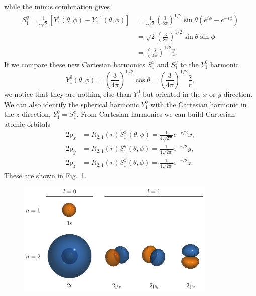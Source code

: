 \documentclass[../Main/chem331-notes.tex]{subfiles}
\begin{document}
while the minus combination gives
\begin{equation}
\begin{split}
S_1^y = \frac{1}{i\sqrt{2}} \left[ Y_1^1(\theta,\phi) - Y_1^{-1}(\theta,\phi) \right]
& = \frac{1}{i\sqrt{2}} \left( \frac{3}{8\pi} \right)^{1/2} \sin \theta \left( e^{i\phi} - e^{-i\phi} \right) \\
& = \sqrt{2} \left( \frac{3}{8\pi} \right)^{1/2} \sin \theta \sin \phi \\
& = \left( \frac{3}{4\pi} \right)^{1/2} \frac{y}{r}.
\end{split}
\end{equation}
If we compare these new  Cartesian harmonics $S_1^x$ and $S_1^y$ to the $Y_1^0$ harmonic
\begin{equation}
Y_1^0(\theta,\phi) = \left( \frac{3}{4\pi} \right)^{1/2} \cos \theta = \left( \frac{3}{4\pi} \right)^{1/2} \frac{z}{r},
\end{equation}
we notice that they are nothing else than $Y_1^0$ but oriented in the $x$ or $y$ direction. We can also identify the spherical harmonic $Y_1^0$ with the Cartesian harmonic in the $z$ direction, $Y_1^0 = S_1^z$.
From Cartesian harmonics we can build Cartesian atomic orbitals
\begin{align}
\mathrm{2p}_{x} &= R_{2,1}(r) S_1^x(\theta,\phi) =
\frac{1}{4\sqrt{2 \pi}} e^{-r/2} x, \\
\mathrm{2p}_{y} &= R_{2,1}(r) S_1^{y}(\theta,\phi) =
\frac{1}{4\sqrt{2 \pi}} e^{-r/2} y, \\
\mathrm{2p}_{z} &= R_{2,1}(r) S_1^{z}(\theta,\phi) =
\frac{1}{4\sqrt{2 \pi}} e^{-r/2} z.
\end{align}
These are shown in Fig.~\ref{fig:hydrogenatom:cartesianorbitals}.

\begin{figure}[t!]
   \centering
\includegraphics[width=3.75in]{../Figures/HydrogenAtom/CartesianOrbitals.pdf}
\label{fig:hydrogenatom:cartesianorbitals}
\end{figure}
\end{document}
